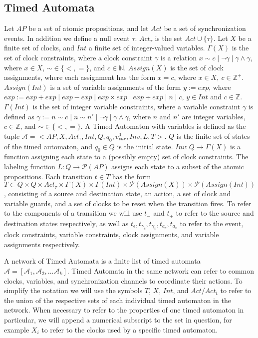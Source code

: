 \documentclass[a4paper,12pt]{article}
\newcommand*\BitOr{\mathbin{|}}
\begin{document}
\subsection{Timed Automata}\label{timed-automata}
Let \(AP\) be a set of atomic propositions, and let \(Act\) be a set of
synchronization events. In addition we define a null event \(\tau\).
\(Act_{\tau}\) is the set \(Act \cup \{\tau\}\). Let \(X\) be a finite set of
clocks, and \(Int\) a finite set of integer-valued variables. \(\Gamma(X)\) is
the set of clock constraints, where a clock constraint \(\gamma\) is a relation
\(x \sim c \BitOr \neg \gamma\BitOr \gamma \land \gamma\), where \(x \in X\),
\(\sim \in \{<,=\}\), and \(c \in \mathbb{N}\). \(Assign(X)\) is the set of
clock assignments, where each assignment has the form \(x = c\), where \(x {\in}
X,\ c {\in} \mathbb{Z}^+\). \(Assign(Int)\) is a set of variable assignments of
the form \(y := exp\), where \(exp := exp + exp\BitOr exp - exp\BitOr exp \times
exp\BitOr exp \div exp\BitOr n\BitOr c\), \(y \in Int\) and \(c \in
\mathbb{Z}\). \(\Gamma(Int)\) is the set of integer variable constraints, where
a variable constraint \(\gamma\) is defined as \(\gamma := n \sim c\BitOr n \sim
n'\BitOr \neg \gamma\BitOr \gamma \land \gamma\), where \(n\) and \(n'\) are
integer variables, \(c \in \mathbb{Z}\), and \(\sim \in \{<,=\}\). A Timed
Automaton with variables is defined as the tuple \(\mathcal{A} = <AP,X,
Act_{\tau}, Int, Q, q_0, v_{var}^0, Inv, L, T>\). \(Q\) is the finite set of
states of the timed automaton, and \(q_0 \in Q\) is the initial state. \(Inv : Q
\rightarrow \Gamma(X)\) is a function assigning each state to a (possibly empty)
set of clock constraints. The labeling function \(L: Q \rightarrow
\mathcal{P}(AP)\) assigns each state to a subset of the atomic propositions.
Each transition \(t \in T\) has the form \(T \subset Q \times Q \times
Act_{\tau} \times \Gamma(X) \times \Gamma(Int) \times \mathcal{P}(Assign(X))
\times \mathcal{P}(Assign(Int))\), consisting of a source and destination state,
an action, a set of clock and variable guards, and a set of clocks to be reset
when the transition fires. To refer to the components of a transition we will
use \(t_-\) and \(t_+\) to refer to the source and destination states
respectively, as well as \(t_\epsilon, t_{\gamma_c}, t_{\gamma_v}, t_{a_c},
t_{a_v}\) to refer to the event, clock constraints, variable constraints, clock
assignments, and variable assignments respectively.

A network of Timed Automata is a finite list of timed automata \(\mathcal{A} =
[\mathcal{A}_1, \mathcal{A}_2, \ldots \mathcal{A}_k]\). Timed Automata in the
same network can refer to common clocks, variables, and synchronization channels
to coordinate their actions. To simplify the notation we will use the symbols
\(T\), \(X\), \(Int\), and \(Act/Act_t\) to refer to the union of the respective
sets of each individual timed automaton in the network. When necessary to refer
to the properties of one timed automaton in particular, we will append a
numerical subscript to the set in question, for example \(X_i\) to refer to the
clocks used by a specific timed automaton.
\end{document}
